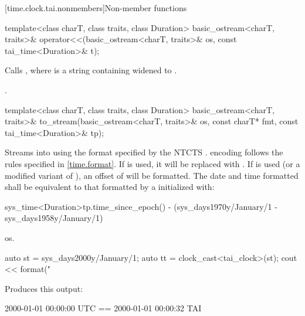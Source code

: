 [time.clock.tai.nonmembers]{Non-member functions}

%
\begin{itemdecl}
template<class charT, class traits, class Duration>
  basic_ostream<charT, traits>&
    operator<<(basic_ostream<charT, traits>& os, const tai_time<Duration>& t);
\end{itemdecl}

\begin{itemdescr}
\pnum
\effects
Calls ,
where  is a string containing
 widened to .

\pnum
\returns {}.
\end{itemdescr}

%
\begin{itemdecl}
template<class charT, class traits, class Duration>
  basic_ostream<charT, traits>&
    to_stream(basic_ostream<charT, traits>& os, const charT* fmt, const tai_time<Duration>& tp);
\end{itemdecl}

\begin{itemdescr}
\pnum
\effects
Streams  into  using
the format specified by the NTCTS .
 encoding follows the rules specified in \ref{time.format}.
If  is used, it will be replaced with .
If  is used (or a modified variant of ),
an offset of  will be formatted.
The date and time formatted shall be equivalent to
that formatted by a  initialized with:
\begin{codeblock}
sys_time<Duration>{tp.time_since_epoch()} -
  (sys_days{1970y/January/1} - sys_days{1958y/January/1})
\end{codeblock}

\pnum
\returns os.

\pnum
\begin{example}
\begin{codeblock}
auto st = sys_days{2000y/January/1};
auto tt = clock_cast<tai_clock>(st);
cout << format("%
\end{codeblock}

Produces this output:

\begin{codeblock}
2000-01-01 00:00:00 UTC == 2000-01-01 00:00:32 TAI
\end{codeblock}
\end{example}
\end{itemdescr}

